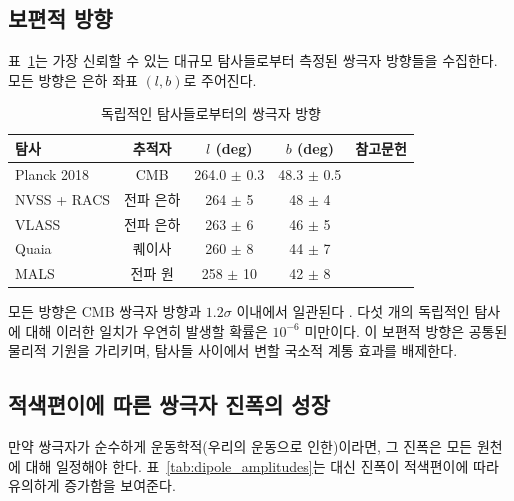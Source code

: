 \documentclass[11pt,a4paper]{article}
\begin{document}
	\subsection{보편적 방향}
	
	표~\ref{tab:dipole_directions}는 가장 신뢰할 수 있는 대규모 탐사들로부터 측정된 쌍극자 방향들을 수집한다. 모든 방향은 은하 좌표 \((l,b)\)로 주어진다.
	
	\begin{table}[htbp]
		\centering
		\caption{독립적인 탐사들로부터의 쌍극자 방향}
		\label{tab:dipole_directions}
		\begin{tabular}{lcccc}
			\toprule
			\textbf{탐사} & \textbf{추적자} & \(l\) (deg) & \(b\) (deg) & \textbf{참고문헌} \\
			\midrule
			Planck 2018 & CMB & 264.0 \(\pm\) 0.3 & 48.3 \(\pm\) 0.5 & \cite{Planck2018VII} \\
			NVSS + RACS & 전파 은하 & 264 \(\pm\) 5 & 48 \(\pm\) 4 & \cite{Oayda2024} \\
			VLASS & 전파 은하 & 263 \(\pm\) 6 & 46 \(\pm\) 5 & \cite{Wagenveld2025} \\
			Quaia & 퀘이사 & 260 \(\pm\) 8 & 44 \(\pm\) 7 & \cite{Secrest2025} \\
			MALS & 전파 원 & 258 \(\pm\) 10 & 42 \(\pm\) 8 & \cite{Wagenveld2025} \\
			\bottomrule
		\end{tabular}
	\end{table}
	
	모든 방향은 CMB 쌍극자 방향과 \(1.2\sigma\) 이내에서 일관된다 \cite{Oayda2024}. 다섯 개의 독립적인 탐사에 대해 이러한 일치가 우연히 발생할 확률은 \(10^{-6}\) 미만이다. 이 보편적 방향은 공통된 물리적 기원을 가리키며, 탐사들 사이에서 변할 국소적 계통 효과를 배제한다.
	
	\subsection{적색편이에 따른 쌍극자 진폭의 성장}
	
	만약 쌍극자가 순수하게 운동학적(우리의 운동으로 인한)이라면, 그 진폭은 모든 원천에 대해 일정해야 한다. 표~\ref{tab:dipole_amplitudes}는 대신 진폭이 적색편이에 따라 유의하게 증가함을 보여준다.
	
\end{document}
